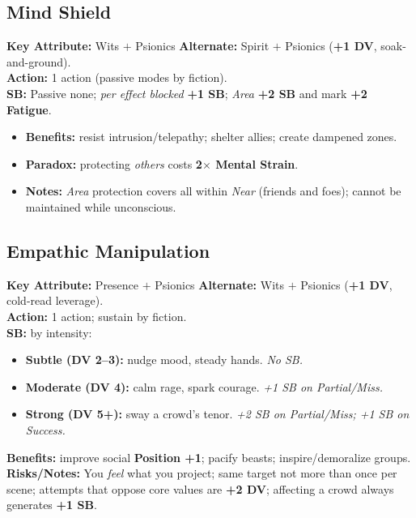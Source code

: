 \documentclass[11pt,twoside]{article}
\begin{document}
\subsection{Mind Shield}
\textbf{Key Attribute:} Wits $+$ Psionics \quad
\textbf{Alternate:} Spirit $+$ Psionics (\textbf{+1 DV}, soak-and-ground). \\
\textbf{Action:} 1 action (passive modes by fiction). \\
\textbf{SB:} Passive none; \emph{per effect blocked} \textbf{+1 SB}; \emph{Area} \textbf{+2 SB} and mark \textbf{+2 Fatigue}.
\begin{itemize}[leftmargin=*]
  \item \textbf{Benefits:} resist intrusion/telepathy; shelter allies; create dampened zones.
  \item \textbf{Paradox:} protecting \emph{others} costs \textbf{2$\times$ Mental Strain}.
  \item \textbf{Notes:} \emph{Area} protection covers all within \textit{Near} (friends and foes); cannot be maintained while unconscious.
\end{itemize}


\subsection{Empathic Manipulation}
\textbf{Key Attribute:} Presence $+$ Psionics \quad
\textbf{Alternate:} Wits $+$ Psionics (\textbf{+1 DV}, cold-read leverage). \\
\textbf{Action:} 1 action; sustain by fiction. \\
\textbf{SB:} by intensity:
\begin{itemize}[leftmargin=*]
  \item \textbf{Subtle (DV 2--3):} nudge mood, steady hands. \emph{No SB.}
  \item \textbf{Moderate (DV 4):} calm rage, spark courage. \emph{+1 SB on Partial/Miss.}
  \item \textbf{Strong (DV 5+):} sway a crowd's tenor. \emph{+2 SB on Partial/Miss; +1 SB on Success.}
\end{itemize}
\textbf{Benefits:} improve social \textbf{Position +1}; pacify beasts; inspire/demoralize groups. \\
\textbf{Risks/Notes:} You \emph{feel} what you project; same target not more than once per scene; attempts that oppose core values are \textbf{+2 DV}; affecting a crowd always generates \textbf{+1 SB}.
\end{document}
